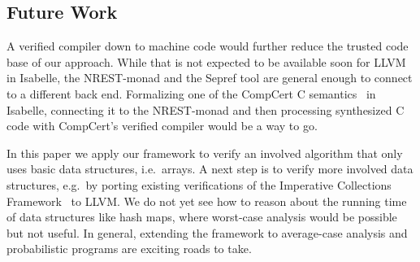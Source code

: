 \documentclass[acmsmall]{acmart}
\begin{document}










\subsection{Future Work}


A verified compiler down to machine code would further reduce the trusted code base of our approach.
While that is not expected to be available soon for LLVM in Isabelle, the NREST-monad and the Sepref tool are general enough to connect to a different back end.
Formalizing one of the CompCert C semantics~\cite{BlazyL09} in Isabelle, connecting it to the NREST-monad and then processing synthesized C code with CompCert's verified compiler would be a way to go.


In this paper we apply our framework to verify an involved algorithm that only uses basic data structures, i.e.\ arrays.
A next step is to verify more involved data structures, e.g.\ by porting existing verifications of the Imperative Collections Framework~\cite{Lammich19_JAR} to LLVM.
We do not yet see how to reason about the running time of data structures like hash maps, where worst-case analysis would be possible but not useful.
In general, extending the framework to average-case analysis and probabilistic programs are exciting roads to take.
\end{document}
